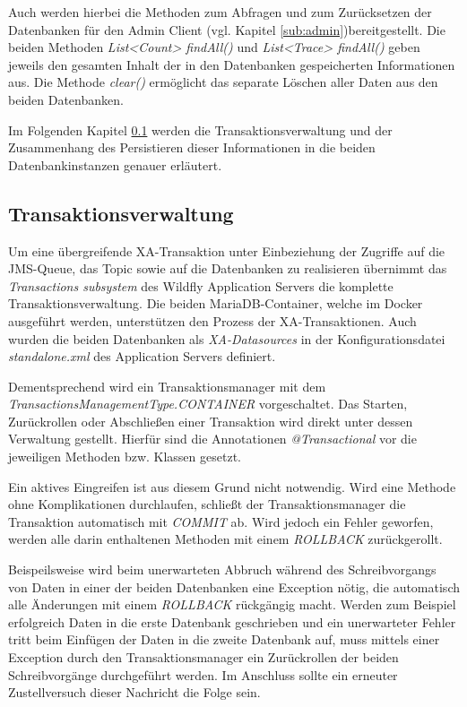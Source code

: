 \documentclass[10pt,journal,compsoc]{IEEEtran}
\begin{document}
Auch werden hierbei die Methoden zum Abfragen und zum Zurücksetzen der Datenbanken für den Admin Client (vgl. Kapitel \ref{sub:admin})bereitgestellt. Die beiden Methoden \textit{List<Count> findAll()} und \textit{List<Trace> findAll()} geben jeweils den gesamten Inhalt der in den Datenbanken gespeicherten Informationen aus. Die Methode \textit{clear()} ermöglicht das separate Löschen aller Daten aus den beiden Datenbanken. 

Im Folgenden Kapitel \ref{sub:transactions} werden die Transaktionsverwaltung und der Zusammenhang des Persistieren dieser Informationen in die beiden Datenbankinstanzen genauer erläutert. 


\subsection{Transaktionsverwaltung}
\label{sub:transactions}
Um eine übergreifende XA-Transaktion unter Einbeziehung der Zugriffe auf die JMS-Queue, das Topic sowie auf die Datenbanken zu realisieren übernimmt das \textit{Transactions subsystem} des Wildfly Application Servers die komplette Transaktionsverwaltung. Die beiden MariaDB-Container, welche im Docker ausgeführt werden, unterstützen den Prozess der XA-Transaktionen. Auch wurden die beiden Datenbanken als \textit{XA-Datasources} in der Konfigurationsdatei \textit{standalone.xml} des Application Servers definiert. 

Dementsprechend wird ein Transaktionsmanager mit dem \textit{TransactionsManagementType.CONTAINER} vorgeschaltet. Das Starten, Zurückrollen oder Abschließen einer Transaktion wird direkt unter dessen Verwaltung gestellt. Hierfür sind die Annotationen \textit{@Transactional} vor die jeweiligen Methoden bzw. Klassen gesetzt. 

Ein aktives Eingreifen ist aus diesem Grund nicht notwendig. Wird eine Methode ohne Komplikationen durchlaufen, schließt der Transaktionsmanager die Transaktion automatisch mit \textit{COMMIT} ab. Wird jedoch ein Fehler geworfen, werden alle darin enthaltenen Methoden mit einem \textit{ROLLBACK} zurückgerollt.

Beispeilsweise wird beim unerwarteten Abbruch während des Schreibvorgangs von Daten in einer der beiden Datenbanken eine Exception nötig, die automatisch alle Änderungen mit einem \textit{ROLLBACK} rückgängig macht. Werden zum Beispiel erfolgreich Daten in die erste Datenbank geschrieben und ein unerwarteter Fehler tritt beim Einfügen der Daten in die zweite Datenbank auf, muss mittels einer Exception durch den Transaktionsmanager ein Zurückrollen der beiden Schreibvorgänge durchgeführt werden. Im Anschluss sollte ein erneuter Zustellversuch dieser Nachricht die Folge sein. 
\end{document}
